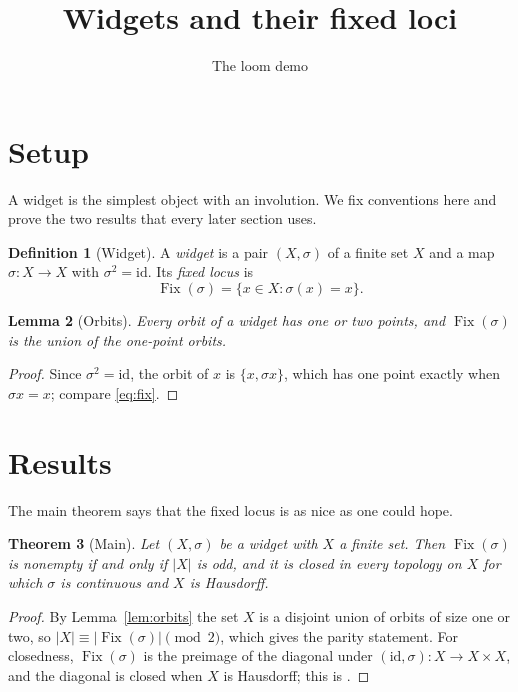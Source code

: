 \documentclass{amsart}
\title{Widgets and their fixed loci}
\author{The loom demo}
\theoremstyle{plain}
\newtheorem{theorem}{Theorem}[section]
\newtheorem{lemma}[theorem]{Lemma}
\theoremstyle{definition}
\newtheorem{definition}[theorem]{Definition}
\theoremstyle{remark}
\newcommand{\Fix}{\operatorname{Fix}}
\begin{document}
\maketitle

\section{Setup}\label{dm-0010}

A widget is the simplest object with an involution. We fix conventions here and prove the two results that every later section uses.


\begin{definition}[Widget]\label{dm-0001}\label{def:widget}
A \emph{widget} is a pair $(X,\sigma)$ of a finite set $X$ and a map $\sigma\colon X\to X$ with $\sigma^2=\mathrm{id}$. Its \emph{fixed locus} is
\begin{equation}\label{eq:fix}
\Fix(\sigma) = \{x\in X : \sigma(x) = x\}.
\end{equation}
\end{definition}



\begin{lemma}[Orbits]\label{dm-0002}\label{lem:orbits}
Every orbit of a widget has one or two points, and $\Fix(\sigma)$ is the union of the one-point orbits.
\end{lemma}
\begin{proof}
Since $\sigma^2=\mathrm{id}$, the orbit of $x$ is $\{x,\sigma x\}$, which has one point exactly when $\sigma x = x$; compare \eqref{eq:fix}.
\end{proof}


\section{Results}\label{dm-0011}

The main theorem says that the fixed locus is as nice as one could hope.


\begin{theorem}[Main]\label{dm-0003}
Let $(X,\sigma)$ be a widget with $X$ a finite set. Then $\Fix(\sigma)$ is nonempty if and only if $|X|$ is odd, and it is closed in every topology on $X$ for which $\sigma$ is continuous and $X$ is Hausdorff.
\end{theorem}
\begin{proof}
By Lemma~\ref{lem:orbits} the set $X$ is a disjoint union of orbits of size one or two, so $|X| \equiv |\Fix(\sigma)| \pmod 2$, which gives the parity statement. For closedness, $\Fix(\sigma)$ is the preimage of the diagonal under $(\mathrm{id},\sigma)\colon X\to X\times X$, and the diagonal is closed when $X$ is Hausdorff; this is \cite[Proposition 3.2]{Calloway14}.
\end{proof}
\end{document}
